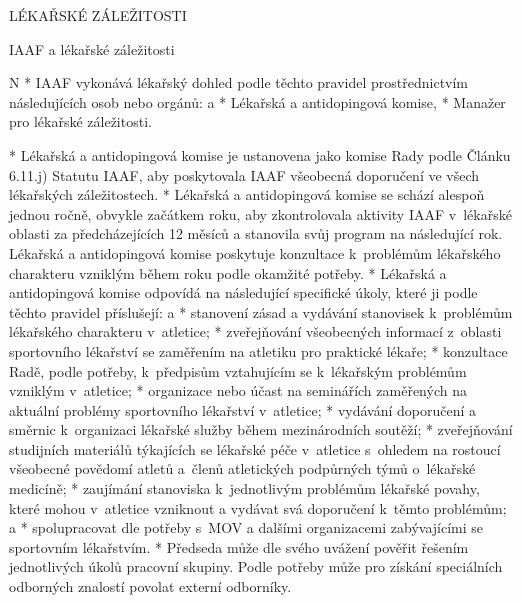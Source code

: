 \sec LÉKAŘSKÉ ZÁLEŽITOSTI

\secc IAAF a lékařské záležitosti

\begitems \style N
* IAAF vykonává lékařský dohled podle těchto pravidel prostřednictvím následujících osob nebo orgánů:
  \begitems \style a
  * Lékařská a antidopingová komise,
  * Manažer pro lékařské záležitosti.
  \enditems

* Lékařská a antidopingová komise je ustanovena jako komise Rady podle Článku 6.11.j) Statutu IAAF, aby poskytovala IAAF všeobecná doporučení ve všech  lékařských záležitostech.
* Lékařská a antidopingová komise se schází alespoň jednou ročně, obvykle začátkem roku, aby zkontrolovala aktivity IAAF v~lékařské oblasti za předcházejících 12 měsíců a stanovila svůj program na následující rok. Lékařská a antidopingová komise poskytuje konzultace k~problémům lékařského charakteru vzniklým během roku podle okamžité potřeby.
* Lékařská a antidopingová komise odpovídá na následující specifické úkoly, které ji podle těchto pravidel příslušejí:
  \begitems \style a
  * stanovení zásad a vydávání stanovisek k~problémům lékařského charakteru v~atletice;
  * zveřejňování všeobecných informací z~oblasti sportovního lékařství se zaměřením na atletiku pro praktické lékaře;
  * konzultace Radě, podle potřeby, k~předpisům vztahujícím se k~lékařským problémům vzniklým v~atletice;
  * organizace nebo účast na seminářích zaměřených na aktuální problémy sportovního lékařství v~atletice;
  * vydávání doporučení a směrnic k~organizaci lékařské služby během mezinárodních soutěží;
  * zveřejňování studijních materiálů týkajících se lékařské péče v~atletice s~ohledem na rostoucí všeobecné povědomí atletů a~členů atletických podpůrných týmů o~lékařské medicíně;
  * zaujímání stanoviska k~jednotlivým problémům lékařské povahy, které mohou v~atletice vzniknout a vydávat svá doporučení k~těmto problémům; a
  * spolupracovat dle potřeby s~MOV a dalšími organizacemi zabývajícími se sportovním lékařstvím.
  \enditems
* Předseda může dle svého uvážení pověřit řešením jednotlivých úkolů pracovní skupiny. Podle potřeby může pro získání speciálních odborných znalostí povolat externí odborníky.

